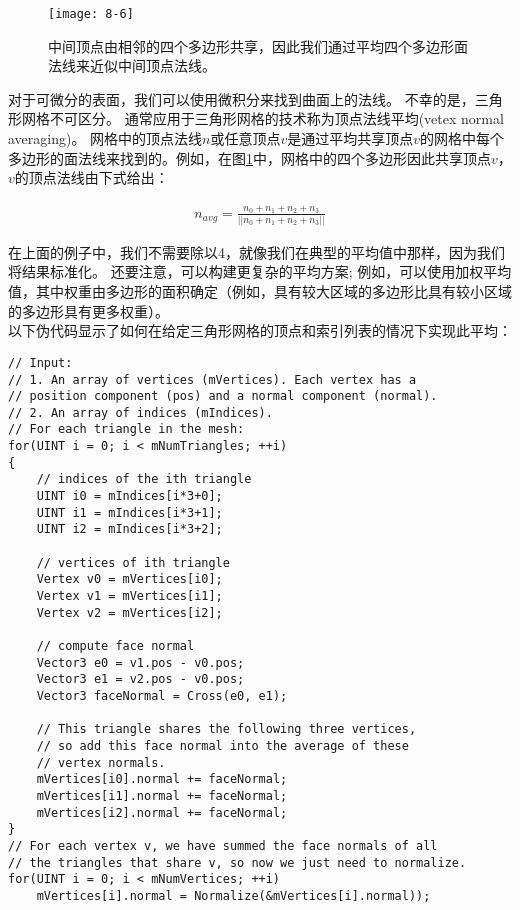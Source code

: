 \begin{figure}[h]
    \label{fig:8-6}
    \texttt{[image: 8-6]}
    \centering
    \caption{中间顶点由相邻的四个多边形共享，因此我们通过平均四个多边形面法线来近似中间顶点法线。}
\end{figure}

\begin{flushleft}
对于可微分的表面，我们可以使用微积分来找到曲面上的法线。 不幸的是，三角形网格不可区分。 通常应用于三角形网格的技术称为顶点法线平均(vetex normal averaging)。 网格中的顶点法线$n$或任意顶点$v$是通过平均共享顶点$v$的网格中每个多边形的面法线来找到的。例如，在图\ref{fig:8-6}中，网格中的四个多边形因此共享顶点$v$， $v$的顶点法线由下式给出：\\
\end{flushleft}

\begin{align*}
n_{avg}=\frac{n_{0}+n_{1}+n_{2}+n_{3}}{||n_{0}+n_{1}+n_{2}+n_{3}||}
\end{align*}

\begin{flushleft}
在上面的例子中，我们不需要除以4，就像我们在典型的平均值中那样，因为我们将结果标准化。 还要注意，可以构建更复杂的平均方案; 例如，可以使用加权平均值，其中权重由多边形的面积确定（例如，具有较大区域的多边形比具有较小区域的多边形具有更多权重）。\\
以下伪代码显示了如何在给定三角形网格的顶点和索引列表的情况下实现此平均：\\
\end{flushleft}

\begin{lstlisting}
// Input:
// 1. An array of vertices (mVertices). Each vertex has a
// position component (pos) and a normal component (normal).
// 2. An array of indices (mIndices).
// For each triangle in the mesh:
for(UINT i = 0; i < mNumTriangles; ++i)
{
    // indices of the ith triangle
    UINT i0 = mIndices[i*3+0];
    UINT i1 = mIndices[i*3+1];
    UINT i2 = mIndices[i*3+2];

    // vertices of ith triangle
    Vertex v0 = mVertices[i0];
    Vertex v1 = mVertices[i1];
    Vertex v2 = mVertices[i2];

    // compute face normal
    Vector3 e0 = v1.pos - v0.pos;
    Vector3 e1 = v2.pos - v0.pos;
    Vector3 faceNormal = Cross(e0, e1);

    // This triangle shares the following three vertices,
    // so add this face normal into the average of these
    // vertex normals.
    mVertices[i0].normal += faceNormal;
    mVertices[i1].normal += faceNormal;
    mVertices[i2].normal += faceNormal;
}
// For each vertex v, we have summed the face normals of all
// the triangles that share v, so now we just need to normalize.
for(UINT i = 0; i < mNumVertices; ++i)
    mVertices[i].normal = Normalize(&mVertices[i].normal));
\end{lstlisting}

